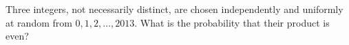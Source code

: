 Three integers, not necessarily distinct, are chosen independently and uniformly at random from $0,1,2,\dots,2013$. What is the probability that their product is even?
